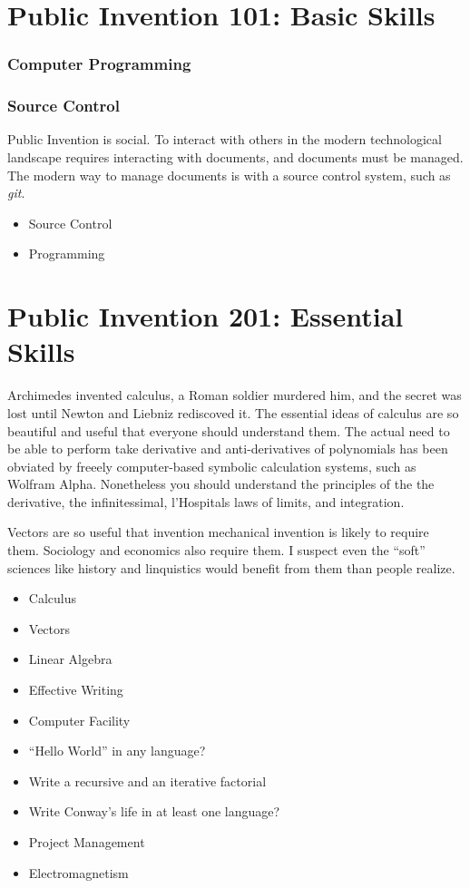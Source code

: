 \documentclass[
	fontsize=10pt, %
	twoside=false, %
	secnumdepth=1, %
]{kaobook}
\begin{document}
\chapter{Public Invention 101: Basic Skills}

\subsection{Computer Programming}

\subsection{Source Control}

Public Invention is social. To interact with others
in the modern technological landscape requires interacting
with documents, and documents must be managed.
The modern way to manage documents is with a source control
system, such as {\em git}.

\begin{itemize}
\item Source Control
\item Programming
\end{itemize}


\chapter{Public Invention 201: Essential Skills}

Archimedes invented calculus, a Roman soldier murdered him,
and the secret was lost until Newton and Liebniz rediscoved it.
The essential ideas of calculus are so beautiful and useful
that everyone should understand them. The actual need to be
able to perform take derivative and anti-derivatives of
polynomials has been obviated by freeely computer-based symbolic
calculation systems, such as Wolfram Alpha.
Nonetheless you should understand the principles of the
the derivative, the infinitessimal, l'Hospitals laws of limits,
and integration.

Vectors are so useful that invention mechanical invention is
likely to require them. Sociology and economics also require them.
I suspect even the ``soft'' sciences
like history and linquistics would benefit from them than people realize.

\begin{itemize}
\item Calculus
\item Vectors
\item Linear Algebra
\item Effective Writing
\item Computer Facility
\item “Hello World” in any language?
\item Write a recursive and an iterative factorial
\item Write Conway’s life in at least one language?
\item Project Management
\item Electromagnetism
\end{itemize}
\end{document}
